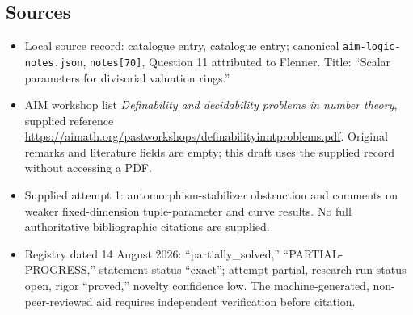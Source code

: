 \documentclass[11pt]{article}
\begin{document}
\subsection{Sources}
\begin{itemize}
\item Local source record: catalogue entry, catalogue entry; canonical \texttt{aim-logic-notes.json}, \texttt{notes[70]}, Question 11 attributed to Flenner. Title: ``Scalar parameters for divisorial valuation rings.''
\item AIM workshop list \emph{Definability and decidability problems in number theory}, supplied reference \url{https://aimath.org/pastworkshops/definabilityinntproblems.pdf}. Original remarks and literature fields are empty; this draft uses the supplied record without accessing a PDF.
\item Supplied attempt 1: automorphism-stabilizer obstruction and comments on weaker fixed-dimension tuple-parameter and curve results. No full authoritative bibliographic citations are supplied.
\item Registry dated 14 August 2026: ``partially\_solved,'' ``PARTIAL-PROGRESS,'' statement status ``exact''; attempt partial, research-run status open, rigor ``proved,'' novelty confidence low. The machine-generated, non-peer-reviewed aid requires independent verification before citation.
\end{itemize}
\end{document}

